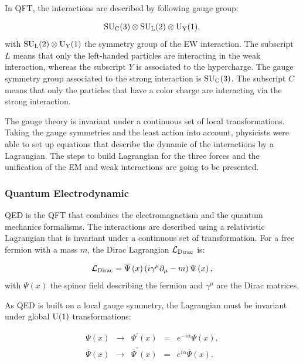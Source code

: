     In \gls{QFT}, the interactions are described by following gauge group:
    
      \begin{equation}
        \rm{SU}_{\rm{C}}(3) \otimes \rm{SU}_{\rm{L}}(2) \otimes \rm{U}_{\rm{Y}}(1),
      \end{equation}
    with $\rm{SU}_{\rm{L}}(2) \otimes \rm{U}_{\rm{Y}}(1)$ the symmetry group of the \gls{EW} interaction. 
    The subscript $L$ means that only the left-handed particles are interacting in the weak interaction, whereas the subscript $Y$ is associated to the hypercharge.
    The gauge symmetry group associated to the strong interaction is $\rm{SU}_{\rm{C}}(3)$.
    The subscript $C$ means that only the particles that have a color charge are interacting via the strong interaction.

    The gauge theory is invariant under a continuous set of local transformations.
    Taking the gauge symmetries and the least action into account, physicists were able to set up equations that describe the dynamic of the interactions by a Lagrangian.
    The steps to build Lagrangian for the three forces and the unification of the \gls{EM} and weak interactions are going to be presented. 

      \subsubsection{Quantum Electrodynamic}
      
      \gls{QED} is the \gls{QFT} that combines the electromagnetism and the quantum mechanics formalisms.
      The interactions are described using a relativistic Lagrangian that is invariant under a continuous set of transformation.
      For a free fermion with a mass $m$, the Dirac Lagrangian $\mathcal{L}_{\rm{Dirac}}$ is:

      \begin{equation}
        \mathcal{L}_{\rm{Dirac}} = \overline{\Psi}\left(x\right) \left(i \gamma^{\mu}\partial_{\mu} - m \right) \Psi\left(x\right),
        \label{eq:diracLag}
      \end{equation}
      with $\Psi\left(x\right)$ the spinor field describing the fermion and $\gamma^{\mu}$ are the Dirac matrices. 
      
      As \gls{QED} is built on a local gauge symmetry, the Lagrangian must be invariant under global $\rm{U}(1)$ transformations:
      
      \begin{equation}
            \begin{array}{rrccr}
             \Psi \left(x \right) & \rightarrow & \Psi^{'} \left(x \right)  & = & e^{-i\alpha} \Psi\left(x\right), \\
             \overline{\Psi}\left(x\right) & \rightarrow & \overline{\Psi}^{'}\left(x\right) & = & e^{i\alpha}  \overline{\Psi}\left(x\right). \\
            \end{array}
        \label{eq:globalTransformations}
      \end{equation}

